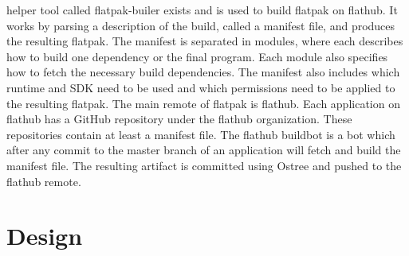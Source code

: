 \documentclass[a4paper,11pt,oneside]{report}
\theoremstyle{definition}
\newcommand{\fp}{flatpak\xspace}
\newcommand{\fh}{flathub\xspace}
\newcommand{\fb}{flatpak-builer\xspace}
\newcommand{\fhbb}{flathub buildbot\xspace}
\begin{document}
helper tool called \fb exists and is used to build \fp on \fh. It works by
parsing a description of the build, called a manifest file, and produces the
resulting \fp. The manifest is separated in modules, where each describes how
to build one dependency or the final program. Each module also specifies how
to fetch the necessary build dependencies. The manifest also includes which
runtime and SDK need to be used and which permissions need to be applied to
the resulting \fp. The main remote of \fp is \fh. Each application on \fh has a
GitHub repository under the \fh organization. These repositories contain at
least a manifest file. The \fhbb is a bot which after any commit to the master
branch of an application will fetch and build the manifest file. The resulting
artifact is committed using Ostree and pushed to the \fh remote.


\chapter{Design}
\label{chap:design}
\end{document}
